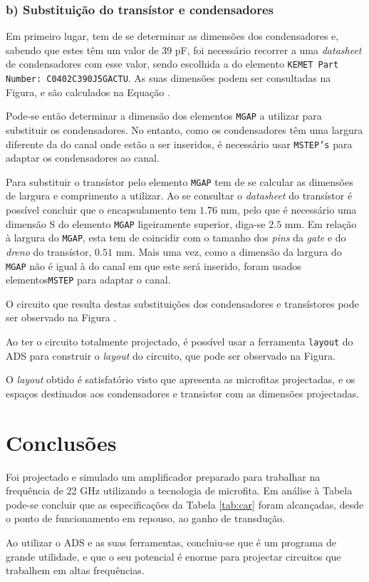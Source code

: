 \documentclass[11pt]{article}
\numberwithin{equation}{section}
\begin{document}
\subsubsection{b) Substituição do transístor e condensadores}

Em primeiro lugar, tem de se determinar as dimensões dos condensadores e, sabendo que estes têm um valor de 39 pF, foi necessário recorrer a uma \textit{datasheet} de condensadores com esse valor, sendo escolhida a do elemento \texttt{KEMET Part Number: C0402C390J5GACTU}. As suas dimensões podem ser consultadas na Figura, e são calculados na Equação .


\vspace{-1mm}
Pode-se então determinar a dimensão dos elementos \texttt{MGAP} a utilizar para substituir os condensadores. No entanto, como os condensadores têm uma largura diferente da do canal onde estão a ser inseridos, é necessário usar \texttt{MSTEP's} para adaptar os condensadores ao canal.

Para substituir o transístor pelo elemento \texttt{MGAP} tem de se calcular as dimensões de largura e comprimento a utilizar. Ao se consultar o \textit{datasheet} do transístor é possível concluir que o encapsulamento tem $1.76$ mm, pelo que é necessário uma dimensão S do elemento \texttt{MGAP} ligeiramente superior, diga-se $2.5$ mm. Em relação à largura do \texttt{MGAP}, esta tem de coincidir com o tamanho dos \textit{pins} da \textit{gate} e do \textit{dreno} do transístor, $0.51$ mm. Mais uma vez, como a dimensão da largura do \texttt{MGAP} não é igual à do canal em que este será inserido, foram usados elementos\texttt{MSTEP} para adaptar o canal.

O circuito que resulta destas substituições dos condensadores e transístores pode ser observado na Figura .


Ao ter o circuito totalmente projectado, é possível usar a ferramenta \texttt{layout} do ADS para construir o \textit{layout} do circuito, que pode ser observado na Figura.


O \textit{layout} obtido é satisfatório visto que apresenta as microfitas projectadas, e os espaços destinados aos condensadores e transistor com as dimensões projectadas.

\section{Conclusões}

Foi projectado e simulado um amplificador preparado para trabalhar na frequência de 22 GHz utilizando a tecnologia de microfita. Em análise à Tabela pode-se concluir que as especificações da Tabela \ref{tab:car} foram alcançadas, desde o ponto de funcionamento em repouso, ao ganho de transdução.

Ao utilizar o ADS e as suas ferramentas, concluiu-se que é um programa de grande utilidade, e que o seu potencial é enorme para projectar circuitos que trabalhem em altas frequências.
\end{document}
